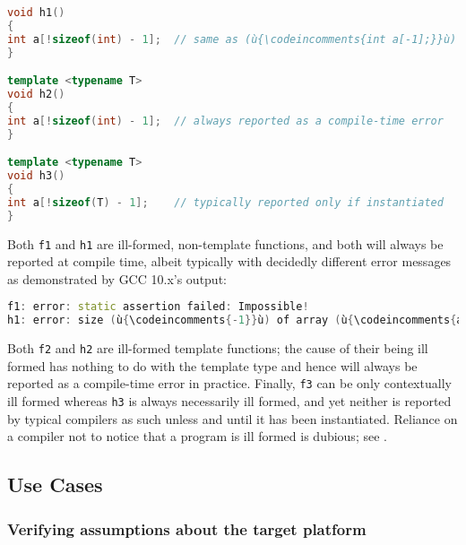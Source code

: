 \begin{lstlisting}[language=C++]
void h1()
{
int a[!sizeof(int) - 1];  // same as (ù{\codeincomments{int a[-1];}}ù) and is ill formed
}

template <typename T>
void h2()
{
int a[!sizeof(int) - 1];  // always reported as a compile-time error
}

template <typename T>
void h3()
{
int a[!sizeof(T) - 1];    // typically reported only if instantiated
}
\end{lstlisting}

\noindent Both \lstinline!f1! and \lstinline!h1! are ill-formed, non-template functions,
and both will always be reported at compile time, albeit typically with
decidedly different error messages as demonstrated by GCC 10.x's output:

\begin{lstlisting}[language=C++]
f1: error: static assertion failed: Impossible!
h1: error: size (ù{\codeincomments{-1}}ù) of array (ù{\codeincomments{a}}ù) is negative
\end{lstlisting}

\noindent Both \lstinline!f2! and \lstinline!h2! are ill-formed template functions; the cause of their being ill formed has nothing to do with the
template type and hence will always be reported as a compile-time error
in practice. Finally, \lstinline!f3! can be only contextually ill formed
whereas \lstinline!h3! is always necessarily ill formed, and yet neither is
reported by typical compilers as such unless and until it has been
instantiated. Reliance on a compiler not to notice that a program is
ill formed is dubious; see
.

\subsection[Use Cases]{Use Cases}\label{use-cases}

\subsubsection[Verifying assumptions about the target platform]{Verifying assumptions about the target platform}\label{verifying-assumptions-about-the-target-platform}

